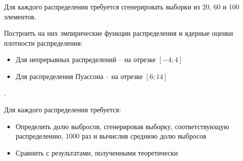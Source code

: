 Для каждого распределения требуется сгенерировать выборки из 20, 60 и 100 элементов.

Построить на них эмпирические функции распределения и ядерные оценки плотности распределения:
\begin{itemize}
	\item Для непрерывных распределений -- на отрезке $[-4; 4]$
	\item Для распределения Пуассона -- на отрезке $[6; 14]$
\end{itemize} .

Для каждого распределения требуется:
\begin{itemize}
	\item Определить долю выбросов, сгенерировав выборку, соответствующую распределению, 1000 раз и вычислив среднюю долю выбросов
	\item Сравнить с результатами, полученными теоретически
\end{itemize}
